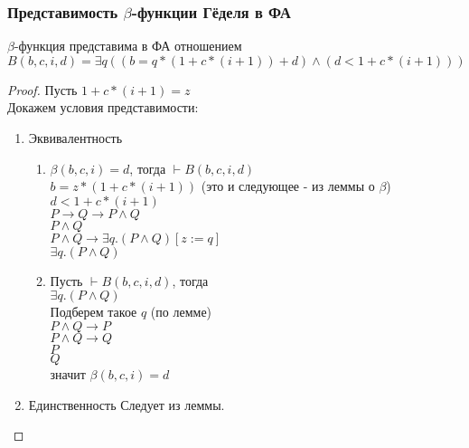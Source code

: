 \subsubsection{Представимость \texorpdfstring{$\beta$}{бета}-функции Гёделя в ФА}
\label{sec-11-3-4}
\begin{lemma}
$\beta$-функция представима в ФА отношением\\
$B(b,c,i,d) = \exists q((b = q * (1 + c * (i + 1)) + d) \land (d < 1 + c * (i + 1)))$
\end{lemma}
\begin{proof}
Пусть $1 + c * (i + 1) = z$\\
Докажем условия представимости:
\begin{enumerate}
\item Эквивалентность
\begin{enumerate}
\item $\beta(b,c,i) = d$, тогда $\vdash B(b,c,i,d)$\\
$b = z * (1 + c * (i + 1))$ (это и следующее - из леммы о $\beta$)\\
$d < 1 + c * (i + 1)$\\
$P \to Q \to P \land Q$\\
$P \land Q$\\
$P \land Q \to \exists q.(P \land Q) [z:= q]$\\
$\exists q.(P \land Q)$
\item Пусть $\vdash B(b,c,i,d)$, тогда\\
$\exists q.(P \land Q)$\\
Подберем такое $q$ (по лемме)\\
$P \land Q \to P$\\
$P \land Q \to Q$\\
$P$\\
$Q$\\
значит $\beta(b,c,i) = d$
\end{enumerate}
\item Единственность
Следует из леммы.
\end{enumerate}
\end{proof}
